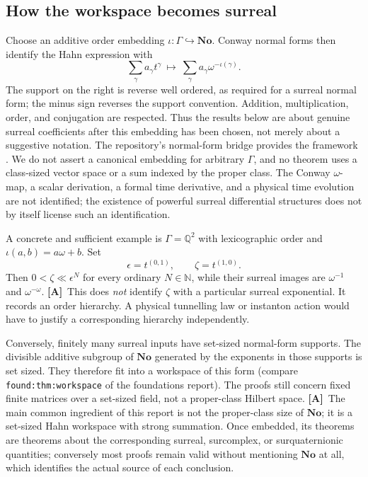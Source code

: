 \documentclass[11pt,oneside]{article}
\numberwithin{equation}{section}
\theoremstyle{plain}
\theoremstyle{definition}
\theoremstyle{remark}
\newcommand{\Q}{\mathbb Q}
\newcommand{\N}{\mathbb N}
\newcommand{\No}{\mathbf{No}}
\newcommand{\TA}{\textcolor{TierA}{\textsf{\bfseries[A]}}}
\begin{document}
\subsection{How the workspace becomes surreal}\label{qgs:sec:surreal}
Choose an additive order embedding $\iota:\Gamma\hookrightarrow\No$. Conway normal forms then identify the Hahn expression with
\begin{equation}\label{qgs:eq:embedding}
 \sum_\gamma a_\gamma t^\gamma\ \longmapsto\ \sum_\gamma a_\gamma\omega^{-\iota(\gamma)}.
\end{equation}
The support on the right is reverse well ordered, as required for a surreal normal form; the minus sign reverses the support convention. Addition, multiplication, order, and conjugation are respected. Thus the results below are about genuine surreal coefficients after this embedding has been chosen, not merely about a suggestive notation. The repository's normal-form bridge provides the framework \cite{repoLedger}. We do not assert a canonical embedding for arbitrary $\Gamma$, and no theorem uses a class-sized vector space or a sum indexed by the proper class. The Conway $\omega$-map, a scalar derivation, a formal time derivative, and a physical time evolution are not identified; the existence of powerful surreal differential structures \cite{BM} does not by itself license such an identification.

A concrete and sufficient example is $\Gamma=\Q^2$ with lexicographic order and $\iota(a,b)=a\omega+b$. Set
\begin{equation}\label{qgs:eq:ranktwo}
 \epsilon=t^{(0,1)},\qquad \zeta=t^{(1,0)}.
\end{equation}
Then $0<\zeta\ll\epsilon^N$ for every ordinary $N\in\N$, while their surreal images are $\omega^{-1}$ and $\omega^{-\omega}$. \TA\ This does \emph{not} identify $\zeta$ with a particular surreal exponential. It records an order hierarchy. A physical tunnelling law or instanton action would have to justify a corresponding hierarchy independently.

Conversely, finitely many surreal inputs have set-sized normal-form supports. The divisible additive subgroup of $\No$ generated by the exponents in those supports is set sized. They therefore fit into a workspace of this form (compare \texttt{found:thm:workspace} of the foundations report). The proofs still concern fixed finite matrices over a set-sized field, not a proper-class Hilbert space. \TA\ The main common ingredient of this report is not the proper-class size of $\No$; it is a set-sized Hahn workspace with strong summation. Once embedded, its theorems are theorems about the corresponding surreal, surcomplex, or surquaternionic quantities; conversely most proofs remain valid without mentioning $\No$ at all, which identifies the actual source of each conclusion.
\end{document}
